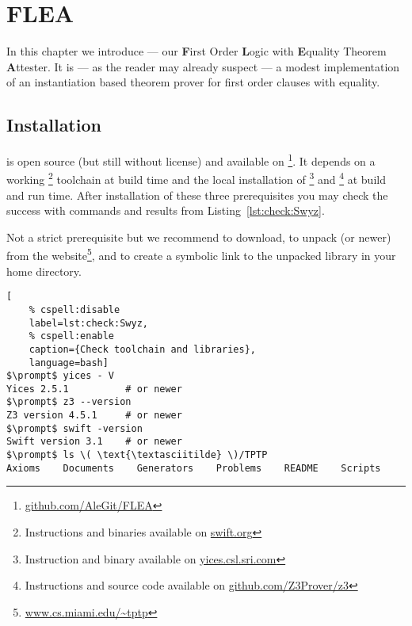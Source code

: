
\chapter{FLEA}



In this chapter we introduce \FLEA{} ---
our
\textbf{F}irst Order \textbf{L}ogic with \textbf{E}quality Theorem \textbf{A}ttester.
It is
--- as the reader may already suspect ---
a modest implementation of an instantiation based theorem prover for first order clauses with equality.


\section{Installation}

\FLEA{} is open source (but still without license) and available on \GitHub\footnote{
	\href{https://github.com/AleGit/FLEA}{github.com/AleGit/FLEA}
}. It depends on a working \Swift\footnote{
	Instructions and binaries available on \href{https://swift.org}{swift.org}
} toolchain at build time and the local installation of
\Yices\footnote{
	Instruction and binary available on \href{http://yices.csl.sri.com}{yices.csl.sri.com}
}
and \Ziii\footnote{
	Instructions and source code available on \href{https://github.com/Z3Prover/z3}{github.com/Z3Prover/z3}
} at build and run time. After installation of these three prerequisites you may check the success with commands and results from Listing~\ref{lst:check:Swyz}.

Not a strict prerequisite but we recommend to download, to unpack \href{http://www.cs.miami.edu/~tptp/TPTP/Distribution/TPTP-v6.4.0.tgz}{\TPTPtgz{}} (or newer)
from the \TPTP{} website\footnote{
	\href{http://www.cs.miami.edu/~tptp/}{www.cs.miami.edu/\textasciitilde tptp}
}, and to create a symbolic link to the unpacked library in your home directory.
\begin{lstlisting}[
	% cspell:disable
	label=lst:check:Swyz,
	% cspell:enable
	caption={Check toolchain and libraries},
	language=bash]
$\prompt$ yices - V
Yices 2.5.1          # or newer
$\prompt$ z3 --version
Z3 version 4.5.1     # or newer
$\prompt$ swift -version
Swift version 3.1    # or newer
$\prompt$ ls \( \text{\textasciitilde} \)/TPTP
Axioms    Documents    Generators    Problems    README    Scripts
\end{lstlisting}

